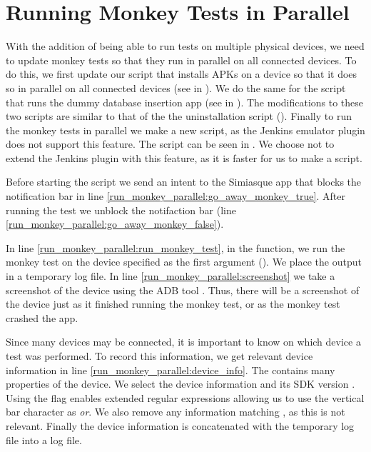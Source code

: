 \section{Running Monkey Tests in Parallel}\label{sec:monkey_in_parallel}
With the addition of being able to run tests on multiple physical devices, we need to update monkey tests so that they run in parallel on all connected devices. To do this, we first update our script that installs APKs on a device so that it does so in parallel on all connected devices (see  in ). We do the same for the script that runs the dummy database insertion app (see  in ). The modifications to these two scripts are similar to that of the the uninstallation script (). Finally to run the monkey tests in parallel we make a new script, as the Jenkins emulator plugin does not support this feature. The script can be seen in . We choose not to extend the Jenkins plugin with this feature, as it is faster for us to make a script.

Before starting the script we send an intent to the Simiasque app that blocks the notification bar in line \ref{run_monkey_parallel:go_away_monkey_true}. After running the test we unblock the notifaction bar (line \ref{run_monkey_parallel:go_away_monkey_false}).

In line \ref{run_monkey_parallel:run_monkey_test}, in the  function, we run the monkey test on the device specified as the first argument (). We place the output in a temporary log file. In line \ref{run_monkey_parallel:screenshot} we take a screenshot of the device using the ADB tool \parencite{stackoverflow-adb-screencap2014}. Thus, there will be a screenshot of the device just as it finished running the monkey test, or as the monkey test crashed the app.

Since many devices may be connected, it is important to know on which device a test was performed. To record this information, we get relevant device information in line \ref{run_monkey_parallel:device_info}. The  contains many properties of the device. We select the device information and its SDK version . Using the  flag enables extended regular expressions allowing us to use the vertical bar character as \emph{or}. We also remove any information matching , as this is not relevant. Finally the device information is concatenated with the temporary log file into a log file.

